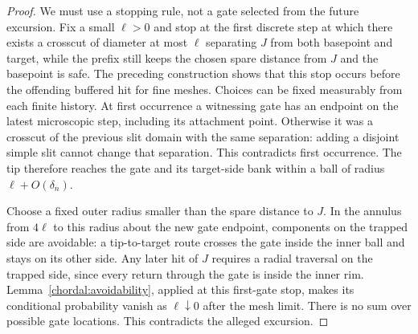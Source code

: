 \begin{proof}
We must use a stopping rule, not a gate selected from the future
excursion.  Fix a small $\ell>0$ and stop at the first discrete step
at which there exists a crosscut of diameter at most $\ell$
separating $J$ from both basepoint and target, while the prefix still
keeps the chosen spare distance from $J$ and the basepoint is safe.
The preceding construction shows that this stop occurs before the
offending buffered hit for fine meshes.  Choices can be fixed
measurably from each finite history.  At first occurrence a witnessing
gate has an endpoint on the latest microscopic step, including its
attachment point.  Otherwise it was a crosscut of the previous slit
domain with the same separation: adding a disjoint simple slit
cannot change that separation.  This contradicts first occurrence.
The tip therefore reaches the gate and its target-side bank within
a ball of radius $\ell+O(\delta_n)$.

Choose a fixed outer radius smaller than the spare distance to $J$.
In the annulus from $4\ell$ to this radius about the new gate
endpoint, components on the trapped side are avoidable: a
tip-to-target route crosses the gate inside the inner ball and stays
on its other side.  Any later hit of $J$ requires a radial traversal
on the trapped side, since every return through the gate is inside
the inner rim.  Lemma~\ref{chordal:avoidability}, applied at this
first-gate stop, makes its conditional probability vanish as
$\ell\downarrow0$ after the mesh limit.  There is no sum over possible
gate locations.  This contradicts the alleged excursion.
\end{proof}

